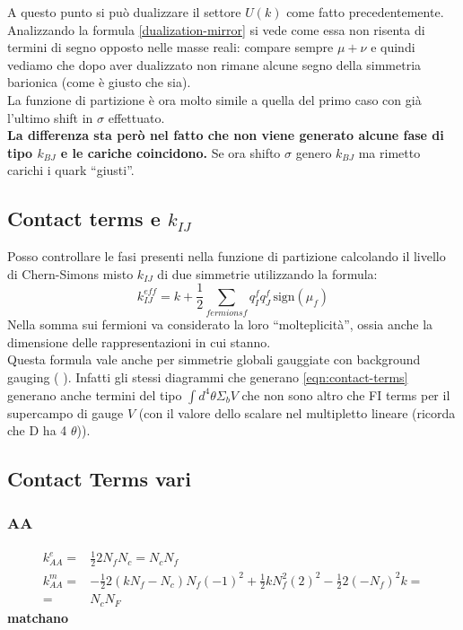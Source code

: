 \documentclass[a4paper,12pt]{article}
\newcommand{\sign}{\mbox{sign}}
\begin{document}
A questo punto si può dualizzare il settore $U(k)$ come fatto precedentemente.\\
Analizzando la formula \ref{dualization-mirror} si vede come essa non risenta di termini di segno opposto nelle masse reali: compare sempre $\mu + \nu$ e quindi vediamo che dopo aver dualizzato non rimane alcune segno della simmetria barionica (come è giusto che sia).\\
La funzione di partizione è ora molto simile a quella del primo caso con già l'ultimo shift in $\sigma$ effettuato. \\
\textbf{ La differenza sta però nel fatto che non viene generato alcune fase di tipo $k_{BJ}$ e le cariche coincidono.}
Se ora shifto $\sigma$ genero $k_{BJ}$ ma rimetto carichi i quark ``giusti''.

\subsection{Contact terms e $k_{IJ}$}
Posso controllare le fasi presenti nella funzione di partizione calcolando il livello di Chern-Simons misto $k_{IJ}$ di due simmetrie utilizzando la formula:
\begin{equation}
  k^{eff}_{IJ} = k + \frac{1}{2} \sum_{fermions f } q^f_I q^f_J \, \sign (\mu_{f})
  \label{eqn:contact-terms}
\end{equation}
Nella somma sui fermioni va considerato la loro ``molteplicità'', ossia anche la dimensione delle rappresentazioni in cui stanno.\\
Questa formula vale anche per simmetrie globali gauggiate con background gauging ( \citep{Aharony:1997bx}). Infatti gli stessi diagrammi che generano \ref{eqn:contact-terms} generano anche termini del tipo
$
  \int d^4 \theta \Sigma_b V
$
che non sono altro che FI terms per il supercampo di gauge $V$ (con il valore dello scalare nel multipletto lineare (ricorda che D ha 4 $\theta$)).




 \subsection*{Contact Terms vari}
 \subsubsection*{ AA }
  \begin{align*}
    k^e_{AA} =& \frac{1}{2}  2 N_f N_c =  N_c N_f\\
    k^m_{AA} =& - \frac{1}{2}  2  (k N_f - N_c) N_f (-1)^2  + \frac{1}{2} k N_f^2 (2)^2 - \frac{1}{2} 2 (- N_f)^2 k = \\
	   =& N_c N_F
  \end{align*}
  \textbf{matchano}
\end{document}
